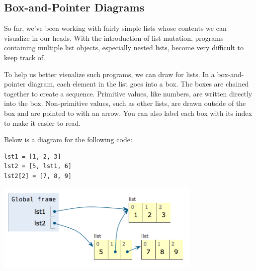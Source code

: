 \subsection*{Box-and-Pointer Diagrams}

So far, we've been working with fairly simple lists whose contents we can
visualize in our heads. With the introduction of list mutation, programs
containing multiple list objects, especially nested lists, become very difficult
to keep track of.

To help us better visualize such programs, we can draw  for lists. In a box-and-pointer diagram, each element in the list
goes into a box. The boxes are chained together to create a sequence.
Primitive values, like numbers, are written directly into the box.
Non-primitive values, such as other lists, are drawn outside of the box and are
pointed to with an arrow. You can also label each box with its index to make it
easier to read.

Below is a diagram for the following code:

\begin{lstlisting}
lst1 = [1, 2, 3]
lst2 = [5, lst1, 6]
lst2[2] = [7, 8, 9]
\end{lstlisting}

\includegraphics[width=280pt]{box-and-pointer.png} \\
